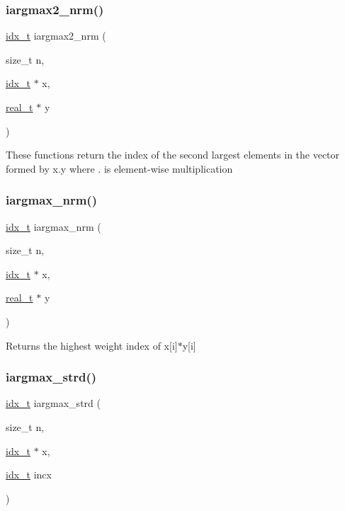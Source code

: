 \subsubsection{\texorpdfstring{iargmax2\+\_\+nrm()}{iargmax2\_nrm()}}
{\footnotesize\ttfamily \hyperlink{a00876_aaa5262be3e700770163401acb0150f52}{idx\+\_\+t} iargmax2\+\_\+nrm (\begin{DoxyParamCaption}\item[{size\+\_\+t}]{n,  }\item[{\hyperlink{a00876_aaa5262be3e700770163401acb0150f52}{idx\+\_\+t} $\ast$}]{x,  }\item[{\hyperlink{a00876_a1924a4f6907cc3833213aba1f07fcbe9}{real\+\_\+t} $\ast$}]{y }\end{DoxyParamCaption})}

These functions return the index of the second largest elements in the vector formed by x.\+y where \textquotesingle{}.\textquotesingle{} is element-\/wise multiplication \mbox{\label{a00870_a156c57a10f383c2b1f9543e0092c1cfe}} 
\subsubsection{\texorpdfstring{iargmax\+\_\+nrm()}{iargmax\_nrm()}}
{\footnotesize\ttfamily \hyperlink{a00876_aaa5262be3e700770163401acb0150f52}{idx\+\_\+t} iargmax\+\_\+nrm (\begin{DoxyParamCaption}\item[{size\+\_\+t}]{n,  }\item[{\hyperlink{a00876_aaa5262be3e700770163401acb0150f52}{idx\+\_\+t} $\ast$}]{x,  }\item[{\hyperlink{a00876_a1924a4f6907cc3833213aba1f07fcbe9}{real\+\_\+t} $\ast$}]{y }\end{DoxyParamCaption})}

Returns the highest weight index of x\mbox{[}i\mbox{]}$\ast$y\mbox{[}i\mbox{]} \mbox{\label{a00870_abe7b3c9f530e871becd2682ff44d746a}} 
\subsubsection{\texorpdfstring{iargmax\+\_\+strd()}{iargmax\_strd()}}
{\footnotesize\ttfamily \hyperlink{a00876_aaa5262be3e700770163401acb0150f52}{idx\+\_\+t} iargmax\+\_\+strd (\begin{DoxyParamCaption}\item[{size\+\_\+t}]{n,  }\item[{\hyperlink{a00876_aaa5262be3e700770163401acb0150f52}{idx\+\_\+t} $\ast$}]{x,  }\item[{\hyperlink{a00876_aaa5262be3e700770163401acb0150f52}{idx\+\_\+t}}]{incx }\end{DoxyParamCaption})}

